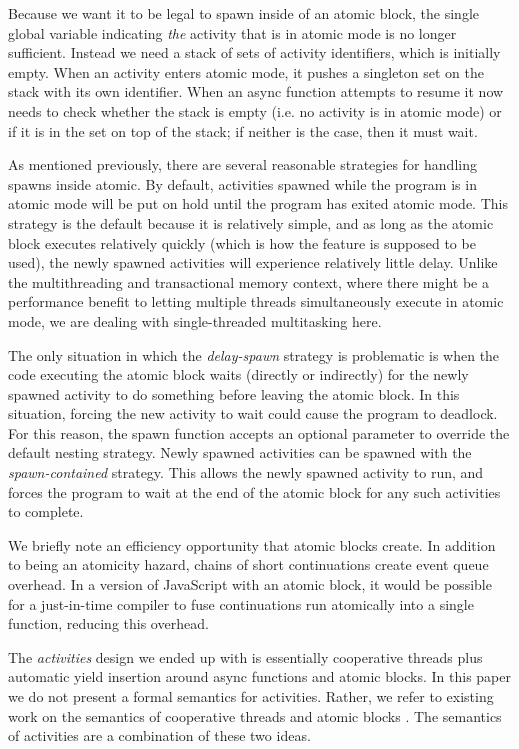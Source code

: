 \documentclass[sigplan,10pt,review,anonymous]{acmart}\settopmatter{printfolios=true,printccs=false,printacmref=false}
\begin{document}
Because we want it to be legal to spawn inside of an atomic block, the single global variable indicating \emph{the} activity that is in atomic mode is no longer sufficient.
Instead we need a stack of sets of activity identifiers, which is initially empty.
When an activity enters atomic mode, it pushes a singleton set on the stack with its own identifier.
When an async function attempts to resume it now needs to check whether the stack is empty (i.e. no activity is in atomic mode) or if it is in the set on top of the stack; if neither is the case, then it must wait.

As mentioned previously, there are several reasonable strategies for handling spawns inside atomic.
By default, activities spawned while the program is in atomic mode will be put on hold until the program has exited atomic mode.
This strategy is the default because it is relatively simple, and as long as the atomic block executes relatively quickly (which is how the feature is supposed to be used), the newly spawned activities will experience relatively little delay.
Unlike the multithreading and transactional memory context, where there might be a performance benefit to letting multiple threads simultaneously execute in atomic mode, we are dealing with single-threaded multitasking here.

The only situation in which the \emph{delay-spawn} strategy is problematic is when the code executing the atomic block waits (directly or indirectly) for the newly spawned activity to do something before leaving the atomic block.
In this situation, forcing the new activity to wait could cause the program to deadlock.
For this reason, the spawn function accepts an optional parameter to override the default nesting strategy.
Newly spawned activities can be spawned with the \emph{spawn-contained} strategy.
This allows the newly spawned activity to run, and forces the program to wait at the end of the atomic block for any such activities to complete.

We briefly note an efficiency opportunity that atomic blocks create.
In addition to being an atomicity hazard, chains of short continuations create event queue overhead.
In a version of JavaScript with an atomic block, it would be possible for a just-in-time compiler to fuse continuations run atomically into a single function, reducing this overhead.

The \emph{activities} design we ended up with is essentially cooperative threads plus automatic yield insertion around async functions and atomic blocks.
In this paper we do not present a formal semantics for activities.
Rather, we refer to existing work on the semantics of cooperative threads \cite{Abadi2009} and atomic blocks \cite{Moore2008}.
The semantics of activities are a combination of these two ideas.
\end{document}
